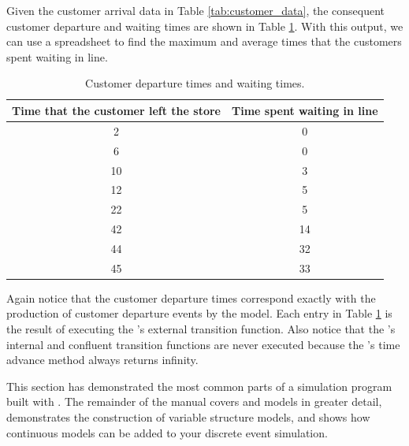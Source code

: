 Given the customer arrival data in Table \ref{tab:customer_data}, the consequent customer departure and waiting times are shown in Table \ref{tab:simulation_output}. With this output, we can use a spreadsheet to find the maximum and average times that the customers spent waiting in line.
\begin{table}
\centering
\begin{tabular}{|c|c|}
\hline
Time that the customer left the store & Time spent waiting in line \\ \hline
2 & 0 \\ \hline
6 & 0 \\ \hline
10 & 3 \\ \hline
12 & 5 \\ \hline
22 & 5 \\ \hline
42 & 14 \\ \hline
44 & 32 \\ \hline
45 & 33 \\ \hline
\end{tabular}
\caption{Customer departure times and waiting times.}
\label{tab:simulation_output}
\end{table}

Again notice that the customer departure times correspond exactly with the production of customer departure events by the  model. Each entry in Table \ref{tab:simulation_output} is the result of executing the 's external transition function. Also notice that the 's internal and confluent transition functions are never executed because the 's time advance method always returns infinity.

This section has demonstrated the most common parts of a simulation program built with \adevs. The remainder of the manual covers  and  models in greater detail, demonstrates the construction of variable structure models, and shows how continuous models can be added to your discrete event simulation.
